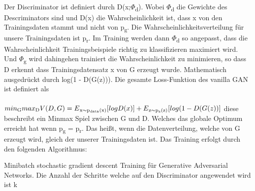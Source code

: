 \documentclass{llncs}
\begin{document}
\\
Der Discriminator ist definiert durch D(x;$\Phi$\textsubscript{d}). Wobei $\Phi$\textsubscript{d} die Gewichte des Descriminators sind und D(x) die Wahrscheinlichkeit ist, dass x von den Trainingsdaten stammt und nicht von p\textsubscript{g}. Die Wahrscheinlichkeitsverteilung für unsere Trainingsdaten ist p\textsubscript{r}.  Im Training werden dann $\Phi$\textsubscript{d} so angepasst, dass die Wahrscheinlichkeit Trainingsbeispiele richtig zu klassifizieren maximiert wird. Und $\Phi$\textsubscript{g} wird dahingehen trainiert die Wahrscheinlichkeit zu minimieren, so dass D erkennt dass Trainingsdatensatz x von G erzeugt wurde. Mathematisch ausgedrückt durch log(1 - D(G(z))). Die gesamte Loss-Funktion des vanilla GAN ist definiert als
\\\\
\begin{math}
min\textsubscript{G} max\textsubscript{D}V(D,G)=E\textsubscript{x$\sim$p\textsubscript{data}(x)}[logD(x)]  + E\textsubscript{z$\sim$p\textsubscript{z}(z)}[log(1-D(G(z))]
\\\\             
\end{math}
diese beschreibt ein Minmax Spiel zwischen G und D. Welches das globale Optimum erreicht hat wenn p\textsubscript{g} = p\textsubscript{r}. Das heißt, wenn die Datenverteilung, welche von G erzeugt wird, gleich der unserer Trainingsdaten ist\cite{goodfellow2014}. Das Training erfolgt durch den folgenden Algorithmus:
\\
\begin{algorithm}[H]
		\caption{Minibatch stochastic gradient descent Training für Generative Adversarial Networks. Die Anzahl der Schritte welche auf den Discriminator angewendet wird ist k }	
\end{algorithm}
\end{document}
